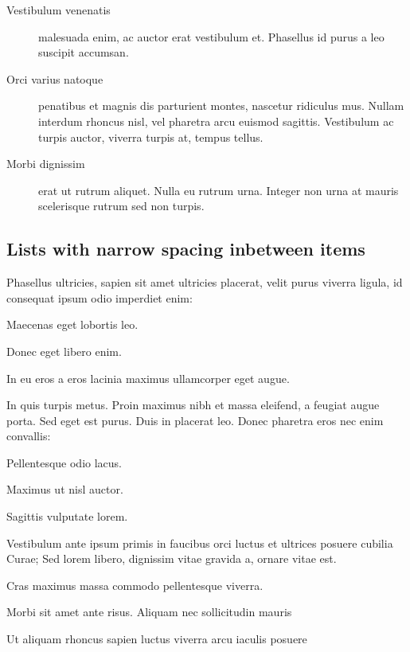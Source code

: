 	\begin{description}
		\item[Vestibulum venenatis] malesuada enim, ac auctor erat vestibulum et. Phasellus id purus a leo suscipit accumsan.
		\item[Orci varius natoque] penatibus et magnis dis parturient montes, nascetur ridiculus mus. Nullam interdum rhoncus nisl, vel pharetra arcu euismod sagittis. Vestibulum ac turpis auctor, viverra turpis at, tempus tellus.
		\item[Morbi dignissim] erat ut rutrum aliquet. Nulla eu rutrum urna. Integer non urna at mauris scelerisque rutrum sed non turpis.
	\end{description}

	\subsection{Lists with narrow spacing inbetween items}

	Phasellus ultricies, sapien sit amet ultricies placerat, velit purus viverra ligula, id consequat ipsum odio imperdiet enim:
	\begin{compactenum}
		\item Maecenas eget lobortis leo.
		\item Donec eget libero enim.
		\item In eu eros a eros lacinia maximus ullamcorper eget augue.
	\end{compactenum}

	\bigskip

	In quis turpis metus. Proin maximus nibh et massa eleifend, a feugiat augue porta. Sed eget est purus. Duis in placerat leo. Donec pharetra eros nec enim convallis:
	\begin{compactitem}
		\item Pellentesque odio lacus.
		\item Maximus ut nisl auctor.
		\item Sagittis vulputate lorem.
	\end{compactitem}

	\bigskip

	Vestibulum ante ipsum primis in faucibus orci luctus et ultrices posuere cubilia Curae; Sed lorem libero, dignissim vitae gravida a, ornare vitae est.
	\begin{compactdesc}
		\item[Cras maximus] massa commodo pellentesque viverra.
		\item[Morbi sit] amet ante risus. Aliquam nec sollicitudin mauris
		\item[Ut aliquam rhoncus sapien] luctus viverra arcu iaculis posuere
	\end{compactdesc}


